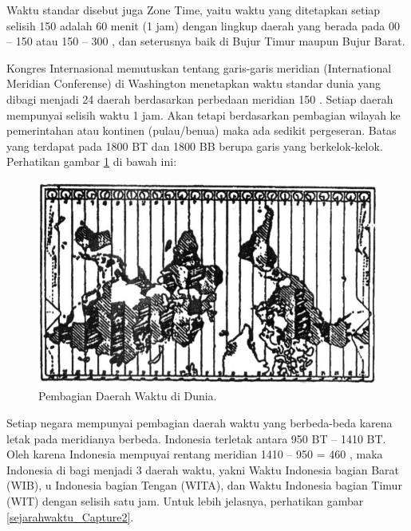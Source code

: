  Waktu standar disebut juga Zone Time, yaitu waktu yang ditetapkan setiap 
 selisih 150 adalah 60 menit (1 jam) dengan lingkup daerah yang berada pada 00 – 150
 atau 150 – 300 , dan seterusnya baik di Bujur Timur maupun Bujur Barat.

 Kongres Internasional memutuskan tentang garis-garis meridian (International Meridian Conferense) 
 di Washington menetapkan waktu standar dunia yang dibagi menjadi 24 daerah berdasarkan
 perbedaan meridian 150 . Setiap daerah mempunyai selisih waktu 1 jam.
 Akan tetapi berdasarkan pembagian wilayah ke pemerintahan atau kontinen (pulau/benua)
 maka ada sedikit pergeseran. Batas yang terdapat pada 1800 BT dan 1800 BB berupa garis
 yang berkelok-kelok. Perhatikan gambar \ref{sejarahwaktu_Capture1} di bawah ini:
 
 \begin{figure}[ht]
 \centerline{\includegraphics[width=1\textwidth]{figures/sejarahwaktu_dunia}}
 \caption{Pembagian Daerah Waktu di Dunia.}
 \label{sejarahwaktu_Capture1}
 \end{figure}
 

 
Setiap negara mempunyai pembagian daerah waktu yang berbeda-beda karena letak pada meridianya berbeda. 
 Indonesia terletak antara 950 BT – 1410 BT. Oleh karena Indonesia mempuyai rentang meridian 1410 – 950 = 460 , 
 maka Indonesia di bagi menjadi 3 daerah waktu, yakni Waktu Indonesia bagian Barat (WIB),
 u Indonesia bagian Tengan (WITA), dan Waktu Indonesia bagian Timur (WIT) dengan selisih
 satu jam. Untuk lebih jelasnya,  perhatikan gambar \ref{sejarahwaktu_Capture2}.


